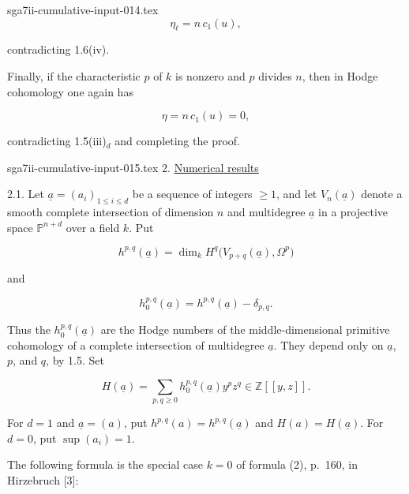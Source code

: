 \begin{filecontents*}{sga7ii-cumulative-input-014.tex}
\begin{equation*}
\eta_\ell=n\,c_1(u),
\end{equation*}

contradicting 1.6(iv).

Finally, if the characteristic $p$ of $k$ is nonzero and $p$ divides $n$,
then in Hodge cohomology one again has

\begin{equation*}
\eta=n\,c_1(u)=0,
\end{equation*}

contradicting 1.5(iii)$_d$ and completing the proof.

\end{filecontents*}
\begin{filecontents*}{sga7ii-cumulative-input-015.tex}
2. \underline{Numerical results}

2.1. Let $\underline a=(a_i)_{1\leq i\leq d}$ be a sequence of integers
$\geq1$, and let $V_n(\underline a)$ denote a smooth complete intersection
of dimension $n$ and multidegree $\underline a$ in a projective space
$\mathbb P^{n+d}$ over a field $k$.  Put

\begin{equation*}
h^{p,q}(\underline a)
=\dim_k H^q\bigl(V_{p+q}(\underline a),\Omega^p\bigr)
\end{equation*}

and

\begin{equation*}
h_0^{p,q}(\underline a)=h^{p,q}(\underline a)-\delta_{p,q}.
\end{equation*}

Thus the $h_0^{p,q}(\underline a)$ are the Hodge numbers of the
middle-dimensional primitive cohomology of a complete intersection of
multidegree $\underline a$.  They depend only on $\underline a$, $p$, and
$q$, by 1.5.  Set

\begin{equation}\tag{2.1.1}
H(\underline a)=\sum_{p,q\geq0}h_0^{p,q}(\underline a)y^pz^q
\in\mathbb Z[[y,z]].
\end{equation}

For $d=1$ and $\underline a=(a)$, put
$h^{p,q}(a)=h^{p,q}(\underline a)$ and $H(a)=H(\underline a)$.  For $d=0$,
put $\sup(a_i)=1$.

The following formula is the special case $k=0$ of formula (2), p.~160,
in Hirzebruch [3]:



\end{filecontents*}
